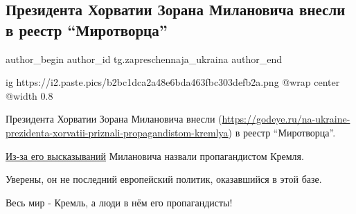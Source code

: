  
 
 
 
 
 
\subsection{Президента Хорватии Зорана Милановича внесли в реестр \enquote{Миротворца}}
\label{sec:26_01_2022.tg.zapreschennaja_ukraina.1.prezident_horvatii_mirotvorec}
 
\ifcmt
 author_begin
   author_id tg.zapreschennaja_ukraina
 author_end
\fi

\ifcmt
  ig https://i2.paste.pics/b2bc1dca2a48e6bda463fbc303defb2a.png
	@wrap center
	@width 0.8
\fi

Президента Хорватии Зорана Милановича внесли
(\url{https://godeye.ru/na-ukraine-prezidenta-xorvatii-priznali-propagandistom-kremlya})
в реестр \enquote{Миротворца}.

\href{https://t.me/godeye_ru/10269}{Из-за его высказываний} Милановича назвали пропагандистом Кремля.

Уверены, он не последний европейский политик, оказавшийся в этой базе.

Весь мир - Кремль, а люди в нём его пропагандисты!

